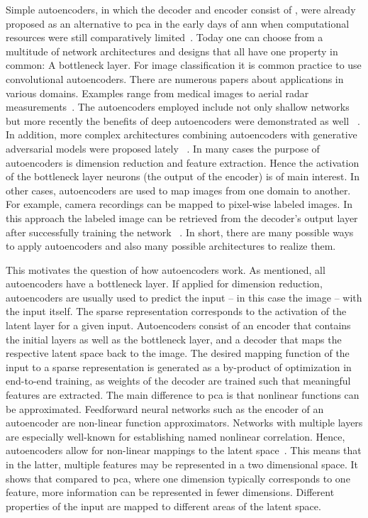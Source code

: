 \bigskip
Simple autoencoders, in which the decoder and encoder consist of , were already proposed as an alternative to \acrshort{pca} in the early days of \acrlong{ann} when computational resources were still comparatively limited~\citep{kramer1991nonlinear}. Today one can choose from a multitude of network architectures and designs that all have one property in common: A bottleneck layer. For image classification it is common practice to use convolutional autoencoders. There are numerous papers about applications in various domains. Examples range from medical images to aerial radar measurements~\citep{chen2017deep}. The autoencoders employed include not only shallow networks but more recently the benefits of deep autoencoders were demonstrated as well ~\citep{geng2015high}. In addition, more complex architectures combining autoencoders with generative adversarial models were proposed lately ~\citep{bao2017cvae}. In many cases the purpose of autoencoders is dimension reduction and feature extraction. Hence the activation of the bottleneck layer neurons (the output of the encoder) is of main interest. In other cases, autoencoders are used to map images from one domain to another. For example, camera recordings can be mapped to pixel-wise labeled images. In this approach the labeled image can be retrieved from the decoder’s output layer after successfully training the network ~\citep{iglovikov2018ternausnet}. In short, there are many possible ways to apply autoencoders and also many possible architectures to realize them.

This motivates the question of how autoencoders work. As mentioned, all autoencoders have a bottleneck layer. If applied for dimension reduction, autoencoders are usually used to predict the input -- in this case the image -- with the input itself. The sparse representation corresponds to the activation of the latent layer for a given input. Autoencoders consist of an encoder that contains the initial layers as well as the bottleneck layer, and a decoder that maps the respective latent space back to the image. The desired mapping function of the input to a sparse representation is generated as a by-product of optimization in end-to-end training, as weights of the decoder are trained such that meaningful features are extracted. The main difference to \acrshort{pca} is that nonlinear functions can be approximated. Feedforward neural networks such as the encoder of an autoencoder are non-linear function approximators. Networks with multiple layers are especially well-known for establishing named nonlinear correlation. Hence, autoencoders allow for non-linear mappings to the latent space~\citep{kramer1991nonlinear}. This means that in the latter, multiple features may be represented in a two dimensional space. It shows that compared to \acrshort{pca}, where one dimension typically corresponds to one feature, more information can be represented in fewer dimensions. Different properties of the input are mapped to different areas of the latent space.

